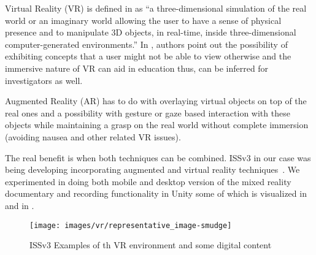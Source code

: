 Virtual Reality (VR) \cite{the-vr-book-2016,vr-interactions-course-siggraph2017,course-context-aware-3d-gesture-vr-s2015}
is defined in \cite{mr-taxonomy-1994} as ``a three-dimensional simulation of 
the real world or an imaginary world allowing the user to have a sense of 
physical presence and to manipulate 3D objects,
in real-time, inside three-dimensional computer-generated environments.''
In \cite{vr-educational-tool-1995}, authors point out the possibility of exhibiting concepts that a user might not be able to 
view otherwise and the immersive nature of VR can aid in education thus, can 
be inferred for investigators as well.

Augmented Reality (AR) has to do with overlaying virtual objects on top of the
real ones and a possibility with gesture or gaze based interaction with
these objects while maintaining a grasp on the real world without complete
immersion (avoiding nausea and other related VR issues).

The real benefit is when both techniques can be combined.
%
ISSv3 in our case was being developing incorporating augmented and virtual
reality techniques~\cite{iss-v3-ar-vr-sa2016,iss-v3-appy-hour-gem2015}.
We experimented in doing both mobile and desktop version of the mixed
reality documentary and recording functionality in Unity some of which
is visualized in  and in .

\begin{figure*}%
\texttt{[image: images/vr/representative\_image-smudge]}%
\caption{ISSv3 Examples of th VR environment and some digital content \cite{iss-v3-ar-vr-sa2016}}%
\label{fig:representative_image-smudge}%
\end{figure*}

